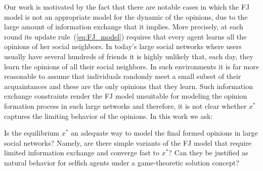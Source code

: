 Our work is motivated by the fact that there are notable cases in which the FJ
model is not an appropriate model for the dynamic of the opinions, due to the
large amount of information exchange that it implies.  More precisely, at each
round its update rule~(\ref{eq:FJ_model}) requires that every agent learns all
the opinions of her social neighbors.  In today's large social networks where
users usually have several hundreds of friends it is highly unlikely that, each
day, they learn the opinions of all their social neighbors.  In such
environments it is far more reasonable to assume that individuals randomly meet
a small subset of their acquaintances and these are the only opinions that they
learn. Such information exchange constraints render the FJ model unsuitable for
modeling the opinion formation process in such large networks and therefore, it
is not clear whether $x^*$ captures the limiting behavior of the opinions. In
this work we ask:
%
\begin{question}\label{q:motivation1}
  Is the equilibrium $x^*$ an adequate way to model the final formed opinions
  in large social networks? Namely, are there simple variants of the FJ model
  that require limited information exchange and converge fast to $x^*$? Can
  they be justified as natural behavior for selfish agents under a
  game-theoretic solution concept?
\end{question}

